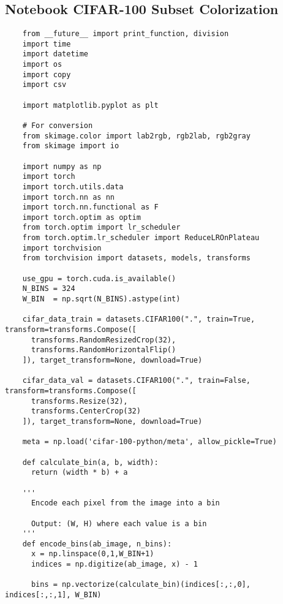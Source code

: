 \appendix
\chapter{}

\section{Notebook CIFAR-100 Subset Colorization}
\label{sec:nootebook_cifar_100}
\begin{longlisting}
  \begin{verbatim}
    from __future__ import print_function, division
    import time
    import datetime
    import os
    import copy
    import csv

    import matplotlib.pyplot as plt

    # For conversion
    from skimage.color import lab2rgb, rgb2lab, rgb2gray
    from skimage import io

    import numpy as np
    import torch
    import torch.utils.data
    import torch.nn as nn
    import torch.nn.functional as F
    import torch.optim as optim
    from torch.optim import lr_scheduler
    from torch.optim.lr_scheduler import ReduceLROnPlateau
    import torchvision
    from torchvision import datasets, models, transforms

    use_gpu = torch.cuda.is_available()
    N_BINS = 324
    W_BIN  = np.sqrt(N_BINS).astype(int)

    cifar_data_train = datasets.CIFAR100(".", train=True, transform=transforms.Compose([
      transforms.RandomResizedCrop(32),
      transforms.RandomHorizontalFlip()
    ]), target_transform=None, download=True)

    cifar_data_val = datasets.CIFAR100(".", train=False, transform=transforms.Compose([
      transforms.Resize(32),
      transforms.CenterCrop(32)
    ]), target_transform=None, download=True)

    meta = np.load('cifar-100-python/meta', allow_pickle=True)

    def calculate_bin(a, b, width):
      return (width * b) + a

    '''
      Encode each pixel from the image into a bin

      Output: (W, H) where each value is a bin
    '''
    def encode_bins(ab_image, n_bins):
      x = np.linspace(0,1,W_BIN+1)
      indices = np.digitize(ab_image, x) - 1
      
      bins = np.vectorize(calculate_bin)(indices[:,:,0], indices[:,:,1], W_BIN)


\end{verbatim}
\end{longlisting}
